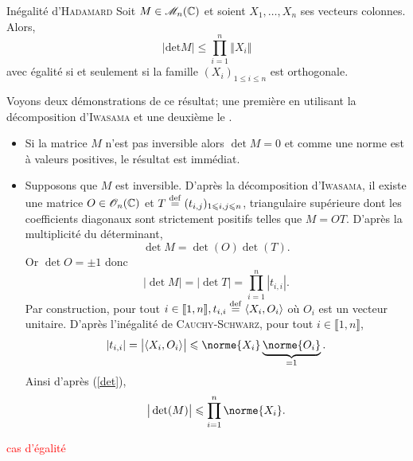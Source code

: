 
\begin{theo}{Inégalité d'\textsc{Hadamard}}
    Soit $M \in \mathscr{M}_n(\mathbb{C})$ et soient $X_1, \dots, X_n$ ses vecteurs colonnes. Alors,
    $$|\mathrm{det} M | \leqslant \prod_{i=1}^{n} \Vert X_i \Vert$$
    avec égalité si et seulement si la famille $(X_i)_{1 \leqslant i \leqslant n}$ est orthogonale.
\end{theo}

%    

Voyons deux démonstrations de ce résultat; une première en utilisant la décomposition d'\textsc{Iwasama} et une deuxième le .

\begin{preuve}
    \begin{itemize}
        \item Si la matrice $M$ n'est pas inversible alors $\det M = 0$ et comme une norme est à valeurs positives, le résultat est immédiat. 
        \item Supposons que $M$ est inversible. D'après la décomposition d'\textsc{Iwasama}, il existe une matrice $O \in \mathscr{O}_n(\mathbb{C})$ et $T \overset{\mathrm{\tiny def}}{=} (t_{i,j})_{1 \leqslant i, j \leqslant n}$, triangulaire supérieure dont les coefficients diagonaux sont strictement positifs telles que $M = OT$. D'après la multiplicité du déterminant, 
        $$\det M = \det(O) \det(T).$$
        Or $\det O = \pm 1$ donc
        \begin{equation} \label{det}
            |\det M | = |\det T | = \prod_{i=1}^{n} |t_{i,i}|.
        \end{equation}
        Par construction, pour tout $i \in \llbracket 1, n \rrbracket, t_{i,i} \overset{\mathrm{\tiny def}}{=} \langle X_i, O_i \rangle$ où $O_i$ est un vecteur unitaire. D'après l'inégalité de \textsc{Cauchy}-\textsc{Schwarz}, pour tout $i \in \llbracket 1, n \rrbracket$, 
        $$|t_{i,i}| = \big|\langle X_i, O_i \rangle\big| \leqslant \norme{X_i} \underbrace{\norme{O_i}}_{=1}.$$
        Ainsi d'après (\ref{det}), 
        $$\big|\det(M)\big| \leqslant \prod_{i=1}^n \norme{X_i}.$$
    \end{itemize}
        \textcolor{red}{cas d'égalité}
\end{preuve}

